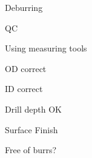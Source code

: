 \documentclass[11pt,a5paper,twoside,openany]{book}
\newenvironment{checklist}{
  \begin{list}{}{}
  
}{%
  \end{list}
}
\begin{document}
\begin{checklist}
\begin{checklist}
\begin{checklist}
\begin{checklist}
			\end{checklist}
		\item Deburring
		\end{checklist}
	\end{checklist}
\item QC
	\begin{checklist}
	\item Using measuring tools
	\item OD correct
	\item ID correct
	\item Drill depth OK
	\item Surface Finish
	\item Free of burrs?
	\end{checklist}
\end{checklist}
\end{document}
